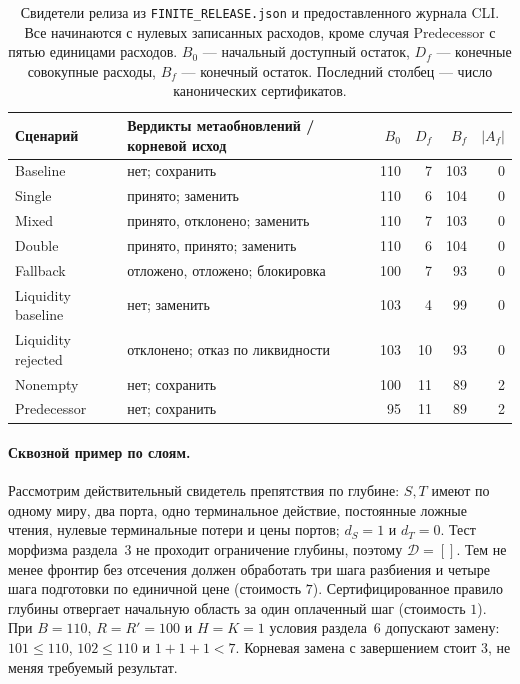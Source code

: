 \documentclass[10pt,a4paper]{article}
\newcommand{\CanonRef}{\mathcal D}
\newcommand{\rc}[1]{\allowbreak\texttt{#1}\allowbreak}
\begin{document}
\begin{table}[htbp]
\centering\small
\caption{Свидетели релиза из \rc{FINITE\_RELEASE.json} и предоставленного журнала CLI. Все начинаются с нулевых записанных расходов, кроме случая Predecessor с пятью единицами расходов. $B_0$ --- начальный доступный остаток, $D_f$ --- конечные совокупные расходы, $B_f$ --- конечный остаток. Последний столбец --- число канонических сертификатов.}\label{tab:release-cases}
\begin{tabularx}{\linewidth}{@{}lXrrrr@{}}\toprule
Сценарий & Вердикты метаобновлений / корневой исход & $B_0$ & $D_f$ & $B_f$ & $|A_f|$\\\midrule
Baseline & нет; сохранить & 110 & 7 & 103 & 0\\
Single & принято; заменить & 110 & 6 & 104 & 0\\
Mixed & принято, отклонено; заменить & 110 & 7 & 103 & 0\\
Double & принято, принято; заменить & 110 & 6 & 104 & 0\\
Fallback & отложено, отложено; блокировка & 100 & 7 & 93 & 0\\
Liquidity baseline & нет; заменить & 103 & 4 & 99 & 0\\
Liquidity rejected & отклонено; отказ по ликвидности & 103 & 10 & 93 & 0\\
Nonempty & нет; сохранить & 100 & 11 & 89 & 2\\
Predecessor & нет; сохранить & 95 & 11 & 89 & 2\\\bottomrule
\end{tabularx}
\end{table}

\paragraph{Сквозной пример по слоям.}
Рассмотрим действительный свидетель препятствия по глубине: $S,T$ имеют по одному миру, два порта, одно терминальное действие, постоянные ложные чтения, нулевые терминальные потери и цены портов; $d_S=1$ и $d_T=0$. Тест морфизма раздела~3 не проходит ограничение глубины, поэтому $\CanonRef=[]$. Тем не менее фронтир без отсечения должен обработать три шага разбиения и четыре шага подготовки по единичной цене (стоимость $7$). Сертифицированное правило глубины отвергает начальную область за один оплаченный шаг (стоимость $1$). При $B=110$, $R=R'=100$ и $H=K=1$ условия раздела~6 допускают замену: $101\le110$, $102\le110$ и $1+1+1<7$. Корневая замена с завершением стоит $3$, не меняя требуемый результат.
\end{document}
